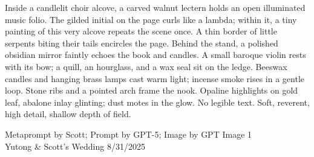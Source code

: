 \documentclass[12pt]{article}
\begin{document}
\noindent
\begin{adjustbox}{max size={\textwidth}{\textheight}}
\begin{varwidth}{\textwidth}
\RaggedRight
\footnotesize
Inside a candlelit choir alcove, a carved walnut lectern holds an open illuminated music folio. The gilded initial on the page curls like a lambda; within it, a tiny painting of this very alcove repeats the scene once. A thin border of little serpents biting their tails encircles the page. Behind the stand, a polished obsidian mirror faintly echoes the book and candles. A small baroque violin rests with its bow; a quill, an hourglass, and a wax seal sit on the ledge. Beeswax candles and hanging brass lamps cast warm light; incense smoke rises in a gentle loop. Stone ribs and a pointed arch frame the nook. Opaline highlights on gold leaf, abalone inlay glinting; dust motes in the glow. No legible text. Soft, reverent, high detail, shallow depth of field.
\end{varwidth}
\end{adjustbox}
\vfill
{\raggedleft\footnotesize
Metaprompt by Scott; Prompt by GPT-5; Image by GPT Image 1 \\
Yutong \& Scott's Wedding 8/31/2025\par}
\end{document}
